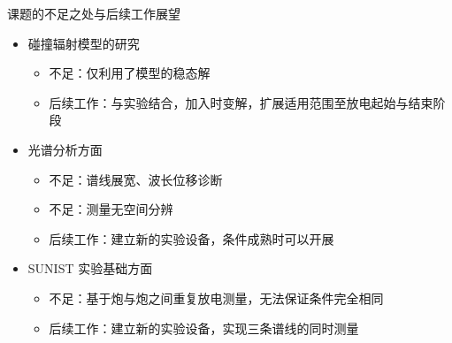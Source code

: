 \begin{CJK*}{UTF8}{kai}
\begin{frame}{课题的不足之处与后续工作展望}
	\begin{itemize}
		\item 碰撞辐射模型的研究
			\begin{itemize}
				\item 不足：仅利用了模型的稳态解
				\item 后续工作：与实验结合，加入时变解，扩展适用范围至放电起始与结束阶段
			\end{itemize}
		\bigskip
		\item 光谱分析方面
			\begin{itemize}
				\item 不足：谱线展宽、波长位移诊断
				\item 不足：测量无空间分辨
				\item 后续工作：建立新的实验设备，条件成熟时可以开展
			\end{itemize}
		\bigskip
		\item SUNIST 实验基础方面
			\begin{itemize}
				\item 不足：基于炮与炮之间重复放电测量，无法保证条件完全相同
				\item 后续工作：建立新的实验设备，实现三条谱线的同时测量%
			\end{itemize}
	\end{itemize}
\end{frame}


\end{CJK*}
